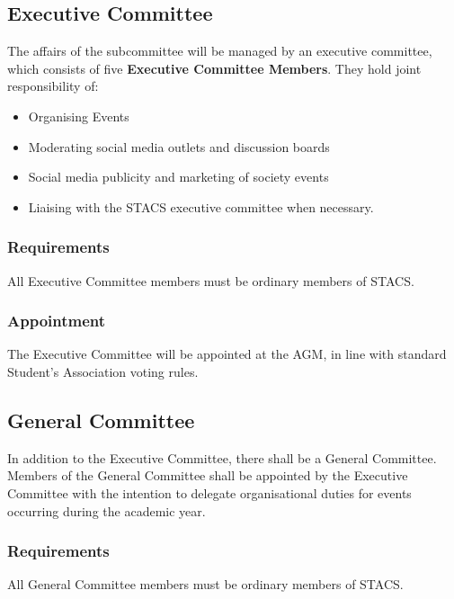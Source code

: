 \documentclass{article}
\begin{document}
        \subsection{Executive Committee}
            The affairs of the subcommittee will be managed by an executive committee, which consists of five \textbf{Executive Committee Members}. They hold joint responsibility of:
            \begin{itemize}
                \item Organising Events
                \item Moderating social media outlets and discussion boards
                \item Social media publicity and marketing of society events
                \item Liaising with the STACS executive committee when necessary.
            \end{itemize}
            \subsubsection{Requirements}
                All Executive Committee members must be ordinary members of STACS.
            \subsubsection{Appointment}
                The Executive Committee will be appointed at the AGM, in line with standard Student's Association voting rules.
        \subsection{General Committee}
            In addition to the Executive Committee, there shall be a General Committee. Members of the General Committee shall be appointed by the Executive Committee with the intention to delegate organisational duties for events occurring during the academic year.
            \subsubsection{Requirements}
                All General Committee members must be ordinary members of STACS.
\end{document}
